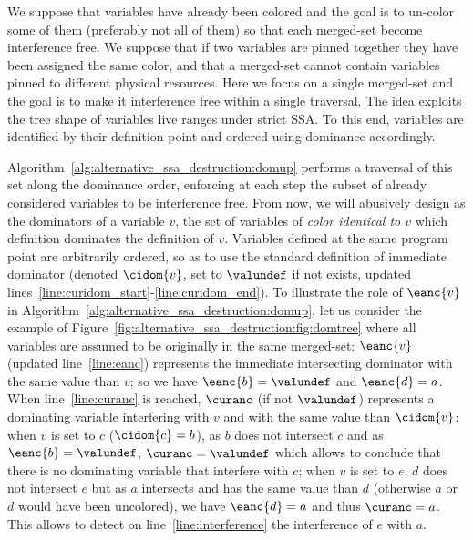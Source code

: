 We suppose that variables have already been colored and the goal is to un-color some of them (preferably not all of them) so that each merged-set become interference free. 
We suppose that if two variables are pinned together they have been assigned the same color, and that a merged-set cannot contain variables pinned to different physical resources. 
Here we focus on a single merged-set and the goal is to make it interference free within a single traversal. 
The idea exploits the tree shape of variables live ranges under strict SSA. 
To this end, variables are identified by their definition point and ordered using dominance accordingly.

Algorithm~\ref{alg:alternative_ssa_destruction:domup} performs a traversal of this set along the dominance order, enforcing at each step the subset of already considered variables to be interference free. 
From now, we will abusively design as the dominators of a variable $v$, the set of variables of \emph{color identical to $v$} which definition dominates the definition of $v$. 
Variables defined at the same program point are arbitrarily ordered, so as to use the standard definition of immediate dominator (denoted $\cidom{v}$, set to $\valundef$ if not exists, updated lines~\ref{line:curidom_start}-\ref{line:curidom_end}). 
To illustrate the role of $\eanc{v}$ in Algorithm~\ref{alg:alternative_ssa_destruction:domup}, let us consider the example of Figure~\ref{fig:alternative_ssa_destruction:fig:domtree} where all variables are assumed to be originally in the same merged-set: 
$\eanc{v}$ (updated line~\ref{line:eanc}) represents the immediate intersecting dominator with the same value than $v$; 
so we have $\eanc{b}=\valundef$ and $\eanc{d}=a$. 
When line~\ref{line:curanc} is reached, $\curanc$ (if not $\valundef$) represents a dominating variable interfering with $v$ and with the same value than $\cidom{v}$: 
when $v$ is set to $c$ ($\cidom{c}=b$), as $b$ does not intersect $c$ and as $\eanc{b}=\valundef$, $\curanc=\valundef$ which allows to conclude that there is no dominating variable that interfere with $c$; 
when $v$ is set to $e$, $d$ does not intersect $e$ but as $a$ intersects and has the same value than $d$ (otherwise $a$ or $d$ would have been uncolored), we have $\eanc{d}=a$ and thus $\curanc=a$. 
This allows to detect on line~\ref{line:interference} the interference of $e$ with $a$.

